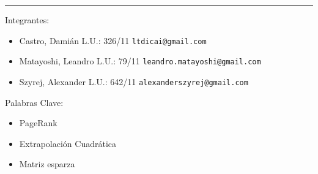 \rule{16 cm}{0.5 mm}

\vspace{2cm}

Integrantes:
\begin{itemize}
	\item Castro, Dami\'an L.U.: 326/11  \verb+ltdicai@gmail.com+
	\item Matayoshi, Leandro L.U.: 79/11 \verb+leandro.matayoshi@gmail.com+
	\item Szyrej, Alexander L.U.: 642/11   \verb+alexanderszyrej@gmail.com+
	
\end{itemize}

\vspace{2cm}

\begin{abstract}
	En 1996, estudiantes de Stanford comenzaron a desarrollar un nuevo motor de b\'usqueda con un principio en mente: Popularidad de p\'aginas web. Para lograr esto llevaron a cabo un sistema llamado \emph{PageRank}, un m\'etodo que les otorga puntaje a cada una de las p\'aginas en toda la red utilizando un an\'alisis probabil\'istico. El siguiente informe analizar\'a algunas implementaciones para resolver dicho sistema y sus fundamentos de por qu\'e son correctas. Primero veremos el m\'etodo de la potencia con una optimizaci\'on que aprovecha el hecho que la matriz proviene de una matriz esparsa y luego analizaremos el m\'etodo de extrapolaci\'on cuadr\'atica para acelerar el m\'etodo anterior. Como \'ultimo veremos como se comparan ambos m\'etodos y discutiremos los resultados.
\end{abstract}

\vspace{2cm}

Palabras Clave:
\begin{itemize}
	\item PageRank
	\item Extrapolaci\'on Cuadr\'atica
	\item Matriz esparza
\end{itemize}

